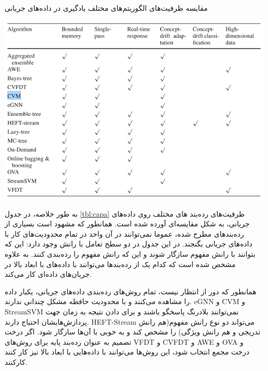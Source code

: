 \begin{table}
  \caption{\cite{Nguyen2015} مقایسه ظرفیت‌های الگوریتم‌های مختلف یادگیری در داده‌های جریانی}
  \label{tbl:capa}
  \includegraphics[width=\linewidth]{capa}
\end{table}

به طور خلاصه، در جدول
\ref{tbl:capa}
ظرفیت‌های رده‌بند های مختلف روی داده‌های جریانی، به شکل مقایسه‌ای آورده شده است. همانطور که مشهود است بسیاری از رده‌بندهای مطرح شده، عموما نمی‌توانند در آن واحد در تمام محدودیت‌های کار با داده‌های جریانی بگنجند. در این جدول در دو سطح تعامل با رانش‌ وجود دارد: این که بتوانند با رانش مفهوم سازگار شوند و این که رانش مفهوم را رده‌بندی کنند. به علاوه مشخص شده است که کدام یک از رده‌بندها می‌توانند با داده‌های با ابعاد بالا در جریان‌های داده‌ای کار می‌کند.

همانطور که دور از انتظار نیست، تمام روش‌های رده‌بندی داده‌های جریانی، یکبار داده‌ را مشاهده می‌کنند و با محدودیت حافظه مشکل چندانی ندارند. eGNN و CVM و StreamSVM نمی‌توانند بلادرنگ پاسخگو باشند و برای دادن نتیجه به زمان جهت پردازش‌هایشان احتیاج دارند. HEFT-Stream می‌تواند دو نوع رانش‌ مفهوم(هم رانش تدریجی و هم رانش ویژگی) را مشخص کند و به خوبی با آن‌ها سازگار شود. اگر درخت تصمیم به عنوان رده‌بند پایه برای روش‌های VFDT و CVFDT و AWE و OVA و درخت مجمع انتخاب شود، این روش‌ها می‌توانند با داده‌هایی با ابعاد بالا نیز کار کنند کارکنند. 


